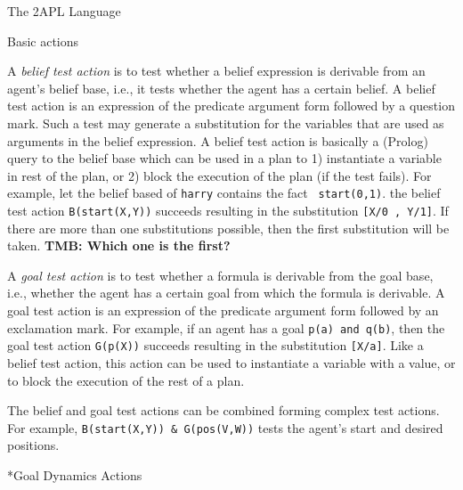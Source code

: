 \begin{chapter}{The 2APL Language}
\begin{section}{Basic actions}
\begin{subsection}
A \emph{belief test action} is to test whether a belief expression
is derivable from an agent's belief base, i.e., it tests whether the
agent has a certain belief. A belief test action  is
an expression of the predicate argument form followed by a question
mark. Such a test may generate a substitution for the variables that
are used as arguments in the belief expression. A belief test action
is basically a (Prolog) query to the belief base which can be used
in a plan to 1) instantiate a variable in rest of the plan, or 2)
block the execution of the plan (if the test fails). For example,
let the belief based of {\tt harry} contains the fact {\tt
start(0,1)}. the belief test action {\tt B(start(X,Y))} succeeds
resulting in the substitution {\tt [X/0 , Y/1]}. If there are more
than one substitutions possible, then the first substitution will be
taken. \textbf{TMB: Which one is the first?}

A \emph{goal test action} is to test whether a formula is derivable
from the goal base, i.e., whether the agent has a certain goal from
which the formula is derivable. A goal test action  is
an expression of the predicate argument form followed by an
exclamation mark. For example, if an agent has a goal {\tt p(a) and
q(b)}, then the goal test action {\tt G(p(X))} succeeds resulting in
the substitution {\tt [X/a]}. Like a belief test action, this action
can be used to instantiate a variable with a value, or to block the
execution of the rest of a plan.

The belief and goal test actions can be combined forming complex
test actions. For example, {\tt B(start(X,Y)) \& G(pos(V,W))} tests
the agent's start and desired positions.
\end{subsection}

\begin{subsection}*{Goal Dynamics Actions}\label{sec:goaldyn}


\end{subsection}
\end{section}
\end{chapter}

